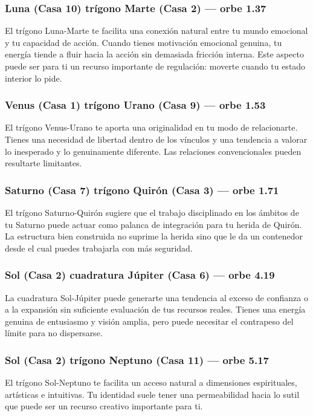 \documentclass[11pt,a4paper]{article}
\begin{document}
\subsubsection*{Luna (Casa 10) trígono Marte (Casa 2) --- orbe 1.37\textdegree}
El trígono Luna-Marte te facilita una conexión natural entre tu mundo emocional y tu capacidad de acción. Cuando tienes motivación emocional genuina, tu energía tiende a fluir hacia la acción sin demasiada fricción interna. Este aspecto puede ser para ti un recurso importante de regulación: moverte cuando tu estado interior lo pide.

\subsubsection*{Venus (Casa 1) trígono Urano (Casa 9) --- orbe 1.53\textdegree}
El trígono Venus-Urano te aporta una originalidad en tu modo de relacionarte. Tienes una necesidad de libertad dentro de los vínculos y una tendencia a valorar lo inesperado y lo genuinamente diferente. Las relaciones convencionales pueden resultarte limitantes.

\subsubsection*{Saturno (Casa 7) trígono Quirón (Casa 3) --- orbe 1.71\textdegree}
El trígono Saturno-Quirón sugiere que el trabajo disciplinado en los ámbitos de tu Saturno puede actuar como palanca de integración para tu herida de Quirón. La estructura bien construida no suprime la herida sino que le da un contenedor desde el cual puedes trabajarla con más seguridad.

\subsubsection*{Sol (Casa 2) cuadratura Júpiter (Casa 6) --- orbe 4.19\textdegree}
La cuadratura Sol-Júpiter puede generarte una tendencia al exceso de confianza o a la expansión sin suficiente evaluación de tus recursos reales. Tienes una energía genuina de entusiasmo y visión amplia, pero puede necesitar el contrapeso del límite para no dispersarse.

\subsubsection*{Sol (Casa 2) trígono Neptuno (Casa 11) --- orbe 5.17\textdegree}
El trígono Sol-Neptuno te facilita un acceso natural a dimensiones espirituales, artísticas e intuitivas. Tu identidad suele tener una permeabilidad hacia lo sutil que puede ser un recurso creativo importante para ti.
\end{document}
